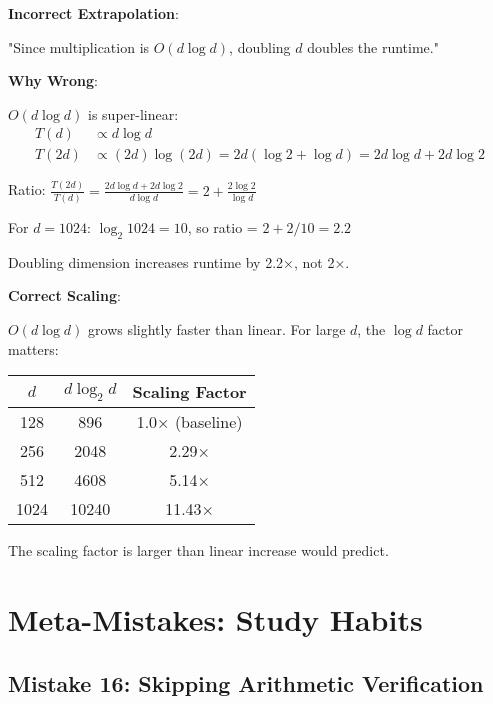 \begin{warning}
\textbf{Incorrect Extrapolation}:

"Since multiplication is $O(d \log d)$, doubling $d$ doubles the runtime."

\textbf{Why Wrong}:

$O(d \log d)$ is super-linear:
\begin{align}
T(d) &\propto d \log d \\
T(2d) &\propto (2d) \log(2d) = 2d(\log 2 + \log d) = 2d \log d + 2d \log 2
\end{align}

Ratio: $\frac{T(2d)}{T(d)} = \frac{2d \log d + 2d \log 2}{d \log d} = 2 + \frac{2 \log 2}{\log d}$

For $d=1024$: $\log_2 1024 = 10$, so ratio = $2 + 2/10 = 2.2$

Doubling dimension increases runtime by 2.2×, not 2×.

\textbf{Correct Scaling}:

$O(d \log d)$ grows slightly faster than linear. For large $d$, the $\log d$ factor matters:

\begin{center}
\begin{tabular}{|c|c|c|}
\hline
$d$ & $d \log_2 d$ & Scaling Factor \\
\hline
128 & 896 & 1.0× (baseline) \\
256 & 2048 & 2.29× \\
512 & 4608 & 5.14× \\
1024 & 10240 & 11.43× \\
\hline
\end{tabular}
\end{center}

The scaling factor is larger than linear increase would predict.
\end{warning}

\section{Meta-Mistakes: Study Habits}

\subsection{Mistake 16: Skipping Arithmetic Verification}

